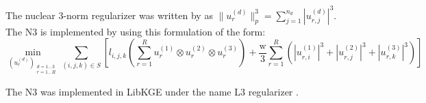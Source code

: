 \begin{table}[!htbp]
\centering
{}
\caption[The best ComplEx configurations]{The best ComplEx configurations found by \citet{chen2021relation}. The MRR is the entity MRR on validation dataset.}
\label{tab:AKBC best models}
\end{table}


The nuclear 3-norm regularizer was written by \citet{lacroix2018canonical} as $\| u_r^{(d)} \|^3_p = \sum_{j=1}^{n_d}|u_{r,j}^{(d)}|^3$. The N3 is implemented by using this formulation of the form:  
\begin{equation}
\label{eq:minization function}
\min_{(u_r^{(d)})_{\substack{d=1\dots3 \\ r=1\dots R}}}\displaystyle\sum_{(i,j,k)\in \mathit{S}}[l_{i,j,k}(\displaystyle\sum_{r=1}^R u_r^{(1)} \otimes u_r^{(2)} \otimes u_r^{(3)}) + \frac{\mathrm{w}}{3}\displaystyle\sum_{r=1}^R (|u_{r,i}^{(1)}|^3 + |u_{r,j}^{(2)}|^3 + |u_{r,k}^{(3)}|^3)]
\end{equation}

The N3 was implemented in LibKGE under the name L3 regularizer \citep{Ruffinelli2020You}.

